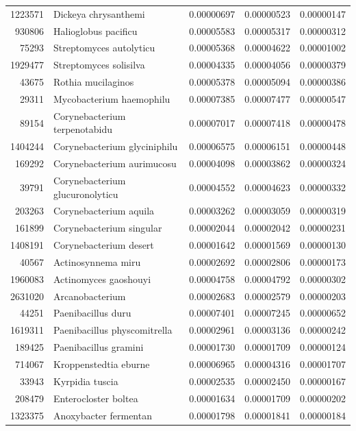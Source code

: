 \begin{table}[ht]
\begin{tabular}{rlrrr}
  1223571 & Dickeya chrysanthemi & 0.00000697 & 0.00000523 & 0.00000147 \\ 
  930806 & Halioglobus pacificu & 0.00005583 & 0.00005317 & 0.00000312 \\ 
  75293 & Streptomyces autolyticu & 0.00005368 & 0.00004622 & 0.00001002 \\ 
  1929477 & Streptomyces solisilva & 0.00004335 & 0.00004056 & 0.00000379 \\ 
  43675 & Rothia mucilaginos & 0.00005378 & 0.00005094 & 0.00000386 \\ 
  29311 & Mycobacterium haemophilu & 0.00007385 & 0.00007477 & 0.00000547 \\ 
  89154 & Corynebacterium terpenotabidu & 0.00007017 & 0.00007418 & 0.00000478 \\ 
  1404244 & Corynebacterium glyciniphilu & 0.00006575 & 0.00006151 & 0.00000448 \\ 
  169292 & Corynebacterium aurimucosu & 0.00004098 & 0.00003862 & 0.00000324 \\ 
  39791 & Corynebacterium glucuronolyticu & 0.00004552 & 0.00004623 & 0.00000332 \\ 
  203263 & Corynebacterium aquila & 0.00003262 & 0.00003059 & 0.00000319 \\ 
  161899 & Corynebacterium singular & 0.00002044 & 0.00002042 & 0.00000231 \\ 
  1408191 & Corynebacterium desert & 0.00001642 & 0.00001569 & 0.00000130 \\ 
  40567 & Actinosynnema miru & 0.00002692 & 0.00002806 & 0.00000173 \\ 
  1960083 & Actinomyces gaoshouyi & 0.00004758 & 0.00004792 & 0.00000302 \\ 
  2631020 & Arcanobacterium & 0.00002683 & 0.00002579 & 0.00000203 \\ 
  44251 & Paenibacillus duru & 0.00007401 & 0.00007245 & 0.00000652 \\ 
  1619311 & Paenibacillus physcomitrella & 0.00002961 & 0.00003136 & 0.00000242 \\ 
  189425 & Paenibacillus gramini & 0.00001730 & 0.00001709 & 0.00000124 \\ 
  714067 & Kroppenstedtia eburne & 0.00006965 & 0.00004316 & 0.00001707 \\ 
  33943 & Kyrpidia tuscia & 0.00002535 & 0.00002450 & 0.00000167 \\ 
  208479 & Enterocloster boltea & 0.00001634 & 0.00001709 & 0.00000202 \\ 
  1323375 & Anoxybacter fermentan & 0.00001798 & 0.00001841 & 0.00000184 \\ 

\end{tabular}
\end{table}
